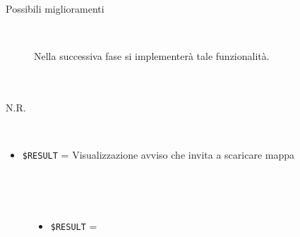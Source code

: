 \documentclass[../../Sperimentazione.tex]{subfiles}
\begin{document}
\begin{tcolorbox}[fonttitle=\bfseries, 
								adjusted title={\Large Prova 6A.1}, 
								breakable, 
								sharp corners=south,
								colback=white, 
								colframe=white!60!black]
\begin{description}[leftmargin=0.7cm,labelwidth=!]
\begin{description}
        					\item[Possibili miglioramenti] \ \par 
        						Nella successiva fase si implementerà tale funzionalità.
        				\end{description}
        				
				\end{description}  
				
			\end{tcolorbox}



	
	\newpage	
			\paragraph*{}	
			\label{Prova7A.1}
			\begin{tcolorbox}[fonttitle=\bfseries, 
								adjusted title={\Large Prova 7A.1}, 
								breakable, 
								sharp corners=south,
								colback=white, 
								colframe=white!60!black]
								
				\begin{description}[leftmargin=0.7cm,labelwidth=!]
				
					\item[Input] \ \par 
        				N.R.
        				
        			\tcbline 
        				
        			\item[Output atteso] \ \par
        				\begin{itemize}
        					\item \verb|$RESULT| = Visualizzazione avviso che invita a scaricare mappa
        				\end{itemize}

					\tcbline        				
        				
        			\item[Output riscontrato] \ \par
        				\begin{description}
        				
        					\item[\dispositivoA] \ \par
        					\begin{itemize}
        						\item \verb|$RESULT| = \ok
        					\end{itemize}      					
        					

\end{description}
\end{description}
\end{tcolorbox}
\end{document}

